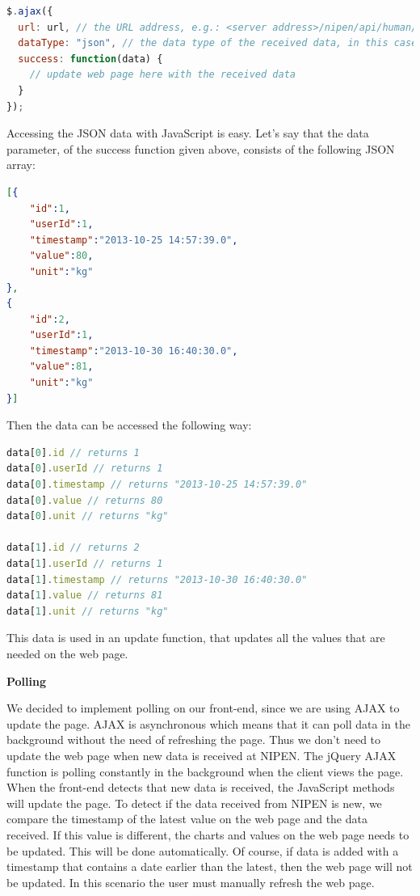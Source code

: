 \begin{lstlisting}[language=JavaScript]
$.ajax({
  url: url, // the URL address, e.g.: <server address>/nipen/api/human/weights
  dataType: "json", // the data type of the received data, in this case a JSON string
  success: function(data) {
    // update web page here with the received data
  }
});
\end{lstlisting}

Accessing the JSON data with JavaScript is easy.
Let's say that the data parameter, of the success function given above, consists of the following JSON array:

\begin{lstlisting}[language=json]
[{
    "id":1,
    "userId":1,
    "timestamp":"2013-10-25 14:57:39.0",
    "value":80,
    "unit":"kg"
},
{
    "id":2,
    "userId":1,
    "timestamp":"2013-10-30 16:40:30.0",
    "value":81,
    "unit":"kg"
}]
\end{lstlisting} 

Then the data can be accessed the following way:

\begin{lstlisting}[language=JavaScript]
data[0].id // returns 1
data[0].userId // returns 1
data[0].timestamp // returns "2013-10-25 14:57:39.0"
data[0].value // returns 80
data[0].unit // returns "kg"

data[1].id // returns 2
data[1].userId // returns 1
data[1].timestamp // returns "2013-10-30 16:40:30.0"
data[1].value // returns 81
data[1].unit // returns "kg"
\end{lstlisting}

This data is used in an update function, that updates all the values that are needed on the web page.

\textbf{Polling}

We decided to implement polling on our front-end, since we are using AJAX to update the page.
AJAX is asynchronous which means that it can poll data in the background without the need of refreshing the page.
Thus we don't need to update the web page when new data is received at NIPEN.
The jQuery AJAX function is polling constantly in the background when the client views the page.
When the front-end detects that new data is received, the JavaScript methods will update the page.
To detect if the data received from NIPEN is new, we compare the timestamp of the latest value on the web page and the data received.
If this value is different, the charts and values on the web page needs to be updated.
This will be done automatically.
Of course, if data is added with a timestamp that contains a date earlier than the latest, then the web page will not be updated.
In this scenario the user must manually refresh the web page.


